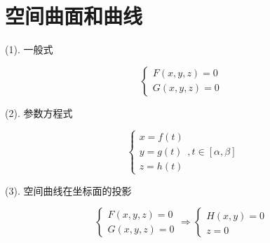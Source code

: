 \section{空间曲面和曲线}

\begin{definition}[空间曲线] 
	(1). 一般式
	
	$$\begin{cases}
		F(x,y,z) = 0 \\
		G(x,y,z) = 0
	\end{cases}$$
	
	(2). 参数方程式
	
	$$\begin{cases}
		x = f(t)\\
		y = g(t)\\
		z = h(t)
	\end{cases},  t\in[\alpha,\beta]$$
	
	(3). 空间曲线在坐标面的投影
	
	$$\begin{cases}
		F(x,y,z) = 0\\
		G(x,y,z) = 0
	\end{cases}\Rightarrow
	\begin{cases}
		H(x,y) = 0\\
		z = 0
	\end{cases}$$
\end{definition}

